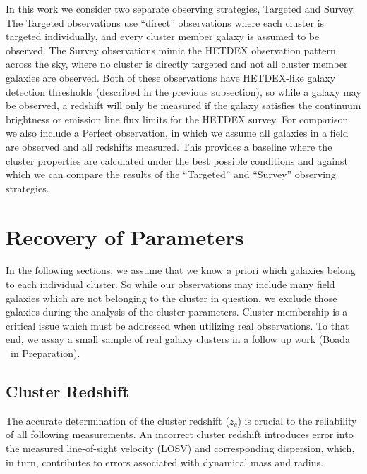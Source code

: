 \documentclass[fleqn,usenatbib]{mnras}
\begin{document}
In this work we consider two separate observing strategies, Targeted and Survey. The Targeted observations use ``direct'' observations where each cluster is targeted individually, and every cluster member galaxy is assumed to be observed. The Survey observations mimic the HETDEX observation pattern across the sky, where no cluster is directly targeted and not all cluster member galaxies are observed. Both of these observations have HETDEX-like galaxy detection thresholds (described in the previous subsection), so while a galaxy may be observed, a redshift will only be measured if the galaxy satisfies the continuum brightness or emission line flux limits for the HETDEX survey. For comparison we also include a Perfect observation, in which we assume all galaxies in a field are observed and all redshifts measured. This provides a baseline where the cluster properties are calculated under the best possible conditions and against which we can compare the results of the ``Targeted'' and ``Survey'' observing strategies.

\section{Recovery of Parameters}\label{sec:recovery}
In the following sections, we assume that we know a priori which galaxies belong to each individual cluster. So while our observations may include many field galaxies which are not belonging to the cluster in question, we exclude those galaxies during the analysis of the cluster parameters. Cluster membership is a critical issue which must be addressed when utilizing real observations. To that end, we assay a small sample of real galaxy clusters in a follow up work (Boada \etal\ in Preparation).

\subsection{Cluster Redshift}
The accurate determination of the cluster redshift ($z_c$) is crucial to the reliability of all following measurements. An incorrect cluster redshift introduces error into the measured line-of-sight velocity (LOSV) and corresponding dispersion, which, in turn, contributes to errors associated with dynamical mass and radius. 
\end{document}
